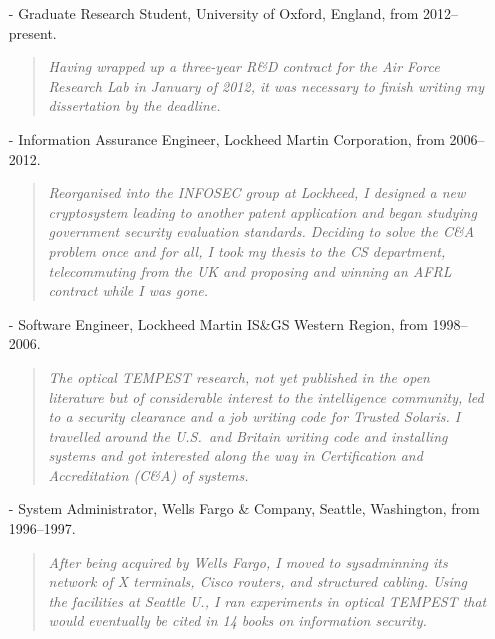 \documentclass[letterpaper]{article}
\begin{document}
\begin{itemize}
	\item[-] Graduate Research Student, University of Oxford, England, from 2012--present.

		\begin{quote}\vspace{-2mm}
			\emph{Having wrapped up a three-year R\&D contract for the Air Force Research
			Lab in January of 2012, it was necessary to finish writing my dissertation by
			the deadline.}
		\end{quote}

	\item[-] Information Assurance Engineer, Lockheed Martin Corporation, from 2006--2012.

		\begin{quote}\vspace{-2mm}
			\emph{Reorganised into the INFOSEC group at Lockheed, I designed a new
			cryptosystem leading to another patent application and began studying
			government security evaluation standards.  Deciding to solve the C\&A problem once
			and for all, I took my thesis to the CS department, telecommuting from the UK and
			proposing and winning an AFRL contract while I was gone.}
		\end{quote}

	\item[-] Software Engineer, Lockheed Martin IS\&GS Western Region, from 1998--2006.

		\begin{quote}\vspace{-2mm}
			\emph{The optical TEMPEST research, not yet published in the open literature but of
			considerable interest to the intelligence community, led to a security clearance and
			a job writing code for Trusted Solaris.  I travelled around the U.S.\ and Britain
			writing code and installing systems and got interested along the way in
			Certification and Accreditation (C\&A) of systems.}
		\end{quote}

	\item[-] System Administrator, Wells Fargo \& Company, Seattle, Washington, from  1996--1997.

		\begin{quote}\vspace{-2mm}
			\emph{After being acquired by Wells Fargo, I moved to sysadminning its network
			of X terminals, Cisco routers, and structured cabling.  Using the facilities
			at Seattle U., I ran experiments in optical TEMPEST that would eventually
			be cited in 14 books on information security.}
		\end{quote}


\end{itemize}
\end{document}

